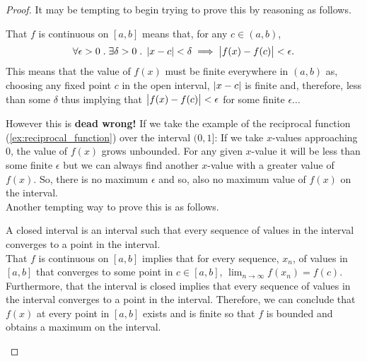 \documentclass[../MathsNotesBase.tex]{subfiles}
\begin{document}
	\begin{proof}
		It may be tempting to begin trying to prove this by reasoning as follows.\\			
		\begin{displayquote}
		That $f$ is continuous on ${ [a,b] }$ means that, for any ${ c \in (a,b) }$,
		\[ \forall \epsilon > 0 \;.\; \exists \delta > 0 \;.\; \left\lvert x - c\right\rvert < \delta \implies \left\lvert f(x) - f(c)\right\rvert < \epsilon. \]
		This means that the value of $f(x)$ must be finite everywhere in ${ (a,b) }$ as, choosing any fixed point $c$ in the open interval, ${ \left\lvert x - c\right\rvert }$ is finite and, therefore, less than some $\delta$ thus implying that ${ \left\lvert f(x) - f(c)\right\rvert < \epsilon }$ for some finite $\epsilon \dots$\\
		\end{displayquote}
		
		However this is \textbf{dead wrong!} If we take the example of the reciprocal function (\ref{ex:reciprocal_function}) over the interval ${ (0,1] }$: If we take $x$-values approaching 0, the value of $f(x)$ grows unbounded. For any given $x$-value it will be less than some finite $\epsilon$ but we can always find another $x$-value with a greater value of $f(x)$. So, there is no maximum $\epsilon$ and so, also no maximum value of $f(x)$ on the interval.\\
		
		Another tempting way to prove this is as follows.\\
		
		\begin{displayquote}
		A closed interval is an interval such that every sequence of values in the interval converges to a point in the interval.\\ 
		That $f$ is continuous on ${ [a,b] }$ implies that for every sequence, $x_n$, of values in ${ [a,b] }$ that converges to some point in ${ c \in [a,b] }$, ${ \lim_{n \to \infty} f(x_n) = f(c) }$. Furthermore, that the interval is closed implies that every sequence of values in the interval converges to a point in the interval. Therefore, we can conclude that $f(x)$ at every point in ${ [a,b] }$ exists and is finite so that $f$ is bounded and obtains a maximum on the interval.\\
		\end{displayquote}
		

\end{proof}
\end{document}
